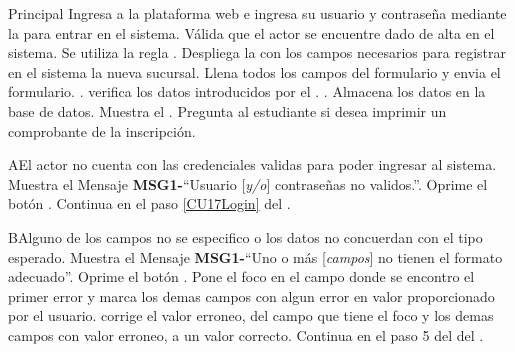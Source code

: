 	\begin{UCtrayectoria}{Principal}
		\UCpaso[\UCactor] Ingresa a la plataforma web e ingresa su usuario y contraseña mediante la \label{CU17Login} para entrar en el sistema.
		\UCpaso Válida que el actor se encuentre dado de alta en el sistema. Se utiliza la regla  .
		\UCpaso Despliega la  con los campos necesarios para registrar en el sistema la nueva sucursal.
		\UCpaso[\UCactor] Llena todos los campos del formulario y envia el formulario. \label{CU17SeleccionarSeminario}.
		\UCpaso verifica los datos introducidos por el \UCactor.  .
		\UCpaso Almacena los datos en la base de datos.
		\UCpaso Muestra el . 
		\UCpaso Pregunta al estudiante si desea imprimir un comprobante de la inscripción.		
	\end{UCtrayectoria}
		
		\begin{UCtrayectoriaA}{A}{El actor no cuenta con las credenciales validas para poder ingresar al sistema.}
			\UCpaso Muestra el Mensaje {\bf MSG1-}``Usuario [{\em y/o}] contraseñas no validos.''.
			\UCpaso[\UCactor] Oprime el botón .
			\UCpaso Continua en el paso \ref{CU17Login} del .
		\end{UCtrayectoriaA}
		
		\begin{UCtrayectoriaA}{B}{Alguno de los campos no se especifico o los datos no concuerdan con el tipo esperado.}
			\UCpaso Muestra el Mensaje {\bf MSG1-}``Uno o más [{\em campos}] no tienen el formato adecuado''.
			\UCpaso[\UCactor] Oprime el botón .
			\UCpaso Pone el foco en el campo donde se encontro el primer error y marca los demas campos con algun error en valor proporcionado por el usuario.
			\UCpaso[\UCactor] corrige el valor erroneo, del campo que tiene el foco y los demas campos con valor erroneo, a un valor correcto.
			      \UCpaso Continua en el paso 5 del del .
		\end{UCtrayectoriaA}
		

